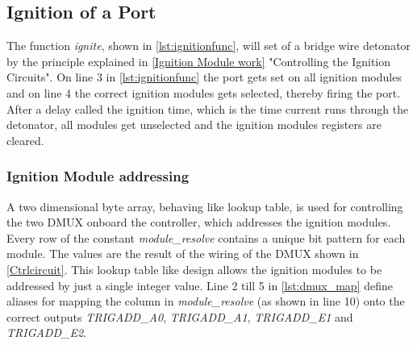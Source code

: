 
\pagebreak

\subsection{Ignition of a Port}



\noindent The function \textit{ignite}, shown in \cref{lst:ignitionfunc}, will set of a bridge wire detonator by the principle explained in \cref{Ignition Module work} "Controlling the Ignition Circuits". On line 3 in \cref{lst:ignitionfunc} the port gets set on all ignition modules and on line 4 the correct ignition modules gets selected, thereby firing the port. After a delay called the ignition time, which is the time current runs through the detonator, all modules get unselected and the ignition modules registers are cleared.\\

\subsubsection{Ignition Module addressing}
\label{Ignition Module addressing}



\noindent A two dimensional byte array, behaving like lookup table, is used for controlling the two DMUX onboard the controller, which addresses the ignition modules. Every row of the constant \textit{module\_resolve} contains a unique bit pattern for each module. The values are the result of the wiring of the DMUX shown in \cref{Ctrlcircuit}. This lookup table like design allows the ignition modules to be addressed by just a single integer value. Line 2 till 5 in \cref{lst:dmux_map} define aliases for mapping the column in \textit{module\_resolve} (as shown in line 10) onto the correct outputs \textit{TRIGADD\_A0}, \textit{TRIGADD\_A1}, \textit{TRIGADD\_E1}  and \textit{TRIGADD\_E2}. 

